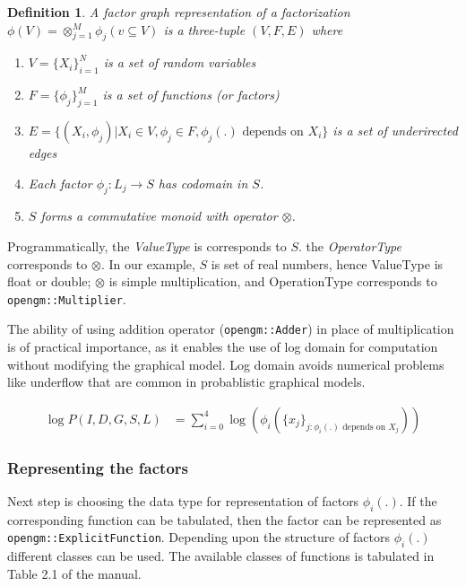 \documentclass[12pt,oneside,letterpaper]{article}
\newtheorem{definition}{Definition}
\begin{document}
\begin{definition}
A \emph{factor graph} representation of a factorization 
$\phi(V) = \otimes_{j=1}^M \phi_j(v \subseteq V)$ 
is a three-tuple $(V, F, E)$ where 
\begin{enumerate}
   \item $V = \{X_i\}_{i=1}^{N}$ is a set of random variables 
   \item $F = \{\phi_j\}_{j=1}^{M}$ is a set of functions (or factors)
   \item $E = \{(X_i, \phi_j) | X_i \in V, \phi_j \in F, \phi_j(.) \text{ depends on } X_i\}$ is a set of underirected edges
   \item Each factor $\phi_j : L_j \rightarrow S$ has codomain in $S$.
   \item $S$ forms a commutative monoid with operator $\otimes$.
\end{enumerate}
\end{definition}

Programmatically, the \emph{ValueType} is corresponds to $S$. the
\emph{OperatorType} corresponds to $\otimes$.  In our example, $S$ is set of real numbers, hence ValueType is float or double;
$\otimes$ is simple multiplication, and OperationType corresponds to
\lstinline|opengm::Multiplier|.


The ability of using addition operator (\lstinline|opengm::Adder|) in place
of multiplication is of practical importance, as it enables the use of log
domain for computation without modifying the graphical model. Log domain avoids
numerical problems like underflow that are common in probablistic graphical models.


\begin{align}
  \log P(I, D, G, S, L) &= \sum_{i=0}^{4} \log( \phi_i(\{ x_j \}_{j : \phi_i(.) \text{ depends on } X_j}) )
  \label{eq:factorization}
\end{align}

\subsubsection{Representing the factors} 

Next step is choosing the data type for representation of factors $\phi_i(.)$.
If the corresponding function can be tabulated, then the factor can be
represented as \lstinline|opengm::ExplicitFunction|. Depending upon the structure of 
factors $\phi_i(.)$ different classes can be used. The available classes of
functions is tabulated in Table 2.1 of the manual.
\end{document}
